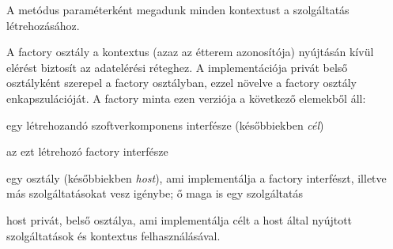 
A  metódus paraméterként megadunk minden kontextust a szolgáltatás létrehozásához. \par


A factory osztály a kontextus (azaz az étterem azonosítója) nyújtásán kívül elérést biztosít az adatelérési réteghez. A  implementációja privát belső osztályként szerepel a factory osztályban, ezzel növelve a factory osztály enkapszulációját. A factory minta ezen verziója a következő elemekből áll: \par

\begin{listing}
	\item egy létrehozandó szoftverkomponens interfésze (későbbiekben \emph{cél})
	\item az ezt létrehozó factory interfésze
	\item egy osztály (későbbiekben \emph{host}), ami implementálja a factory interfészt, illetve más szolgáltatásokat vesz igénybe; ő maga is egy szolgáltatás
	\item host privát, belső osztálya, ami implementálja célt a host által nyújtott szolgáltatások és kontextus felhasználásával.
\end{listing}





